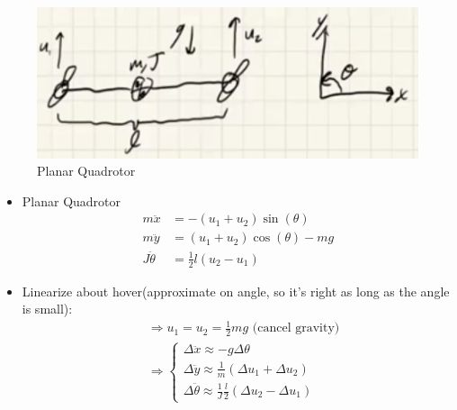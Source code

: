 \begin{figure}
    \centering
    \includegraphics[width=0.4\linewidth]{L8_Images/F2.PNG}
    \caption{Planar Quadrotor}
    \label{fig:l8f2}
\end{figure}

\begin{itemize}
    \item Planar Quadrotor
    \begin{align}
        m \ddot x &= -(u_1 + u_2) \sin(\theta) \\
        m \ddot y &= (u_1 + u_2) \cos(\theta) - mg \\
        J \ddot \theta &= \frac{1}{2} l (u_2 - u_1)
    \end{align}
    \item Linearize about hover(approximate on angle, so it's right as long as the angle is small):
    \begin{align}
        & \Rightarrow u_1 = u_2 = \frac{1}{2} mg \text{ (cancel gravity)} \\
        & \Rightarrow 
        \begin{cases}
            \Delta \ddot x \approx -g \Delta \theta \\
            \Delta \ddot y \approx \frac{1}{m} (\Delta u_1 + \Delta u_2) \\
            \Delta \ddot \theta \approx \frac{1}{J} \frac{l}{2}(\Delta u_2 - \Delta u_1)
        \end{cases} \\
    \end{align}


\end{itemize}
